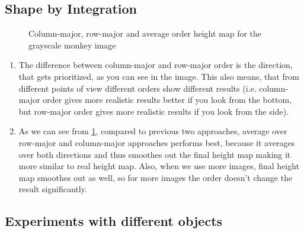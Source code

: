 \documentclass{article}
\begin{document}
\subsection{Shape by Integration}

\begin{figure}[h]
    \centering
    \qquad
    \qquad
    \caption{Column-major, row-major and average order height map for the grayscale monkey image}
    \label{fig:rowvscolumn}
    \end{figure}
    
\begin{enumerate}
    \item The difference between column-major and row-major order is the direction, that gets prioritized, as you can see in the image. This also means, that from different points of view different orders show different results (i.e. column-major order gives more realistic results better if you look from the bottom, but row-major order gives more realistic results if you look from the side).
    
    \item As we can see from \cref{fig:rowvscolumn}, compared to previous two approaches, average over row-major and column-major approaches performs best, because it averages over both directions and thus smoothes out the final height map making it more similar to real height map. Also, when we use more images, final height map smoothes out as well, so for more images the order doesn't change the result significantly.
\end{enumerate}

\subsection{Experiments with different objects}
\end{document}
